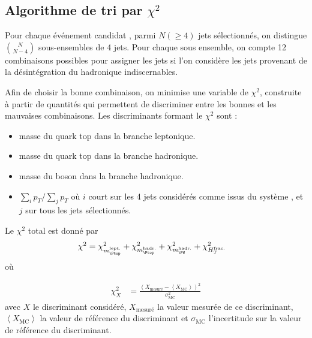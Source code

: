 \subsection{Algorithme de tri par \texorpdfstring{$\chi^2$}{chi²}}

Pour chaque événement candidat \ttbar, parmi $N (\geq 4)$ jets sélectionnés, on distingue $\binom{N}{N - 4}$ sous-ensembles de 4 jets. Pour chaque sous ensemble, on compte 12 combinaisons possibles pour assigner les jets si l'on considère les jets provenant de la désintégration du \PW hadronique indiscernables.

\medskip

Afin de choisir la bonne combinaison, on minimise une variable de $\chi^2$, construite à partir de quantités qui permettent de discriminer entre les bonnes et les mauvaises combinaisons. Les discriminants formant le $\chi^2$ sont :
\begin{itemize}
    \item masse du quark top dans la branche leptonique.
    \item masse du quark top dans la branche hadronique.
    \item masse du boson \PW dans la branche hadronique.
    \item $\sum\limits_i{p_T} / \sum\limits_j{p_T}$ où $i$ court sur les 4 jets considérés comme issus du système \ttbar, et $j$ sur tous les jets sélectionnés.
\end{itemize}

Le $\chi^2$ total est donné par
\begin{align} \label{eq:chi2}
  \chi^2 &= \chi^2_{m_{\Ptop}^{\text{lept.}}} + \chi^2_{m_{\Ptop}^{\text{hadr.}}} + \chi^2_{m_{\PW}^{\text{hadr.}}} + \chi^2_{H_{T}^{\text{frac.}}}
\end{align}
où

\begin{align*}
  \chi^2_X &= \frac{\left( X_\text{mesuré} - \left\langle X_\text{MC} \right\rangle \right)^2}{\sigma_\text{MC}^2}
\end{align*}
avec $X$ le discriminant considéré, $X_\text{mesuré}$ la valeur mesurée de ce discriminant, $\left\langle X_\text{MC} \right\rangle$ la valeur de référence du discriminant et $\sigma_\text{MC}$ l'incertitude sur la valeur de référence du discriminant.

